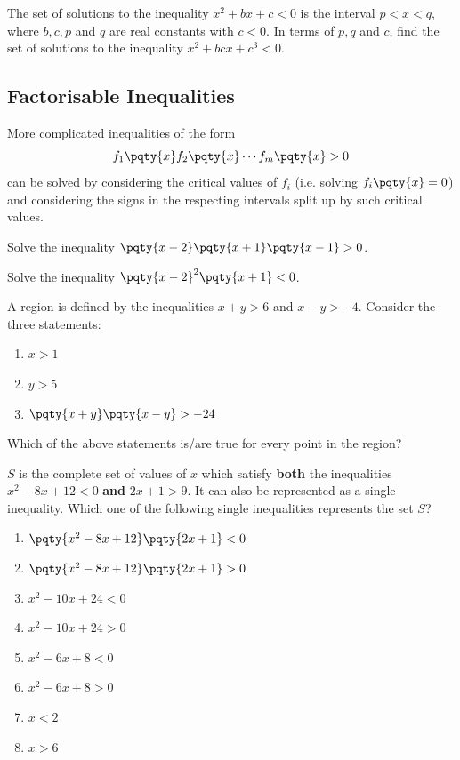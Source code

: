 \documentclass{article}
\begin{document}
\begin{example}[TMUA 2017 P1 Q19]
    The set of solutions to the inequality \(x^2 + bx + c < 0\) is the interval \(p < x < q\), where \(b, c, p\) and \(q\) are real constants with \(c < 0\). In terms of \(p, q\) and \(c\), find the set of solutions to the inequality \(x^2 + bcx + c^3 < 0\).
\end{example}

\subsection{Factorisable Inequalities}
More complicated inequalities of the form
\[
    f_1\pqty{x} f_2\pqty{x} \cdots f_m\pqty{x} > 0
\]
can be solved by considering the critical values of \(f_i\) (i.e. solving \(f_i\pqty{x} = 0\)) and considering the signs in the respecting intervals split up by such critical values.

\begin{example}
    Solve the inequality \(\pqty{x - 2} \pqty{x + 1} \pqty{x - 1} > 0\).
\end{example}

\begin{example}
    Solve the inequality \(\pqty{x - 2}^2 \pqty{x + 1} < 0\).
\end{example}

\begin{example}[TMUA 2016 P2 Q8]
    A region is defined by the inequalities \(x + y > 6\) and \(x - y > -4\). Consider the three statements:
    \begin{enumerate}
        \item \(x > 1\)
        \item \(y > 5\)
        \item \(\pqty{x + y} \pqty{x - y} > -24\)
    \end{enumerate}


    Which of the above statements is/are true for every point in the region?
\end{example}

\begin{example}[TMUA 2017 P1 Q5]
    \(S\) is the complete set of values of \(x\) which satisfy \textbf{both} the inequalities \(x^2 - 8x + 12 < 0\) \textbf{and} \(2x + 1 > 9\). It can also be represented as a single inequality. Which one of the following single inequalities represents the set \(S\)?

    \begin{enumerate}
        \item \(\pqty{x^2 - 8x + 12} \pqty{2x + 1} < 0\)
        \item \(\pqty{x^2 - 8x + 12} \pqty{2x + 1} > 0\)
        \item \(x^2 - 10 x + 24 < 0\)
        \item \(x^2 - 10 x + 24 > 0\)
        \item \(x^2 - 6 x + 8 < 0\)
        \item \(x^2 - 6 x + 8 > 0\)
        \item \(x < 2\)
        \item \(x > 6\)
    \end{enumerate}
\end{example}
\end{document}
